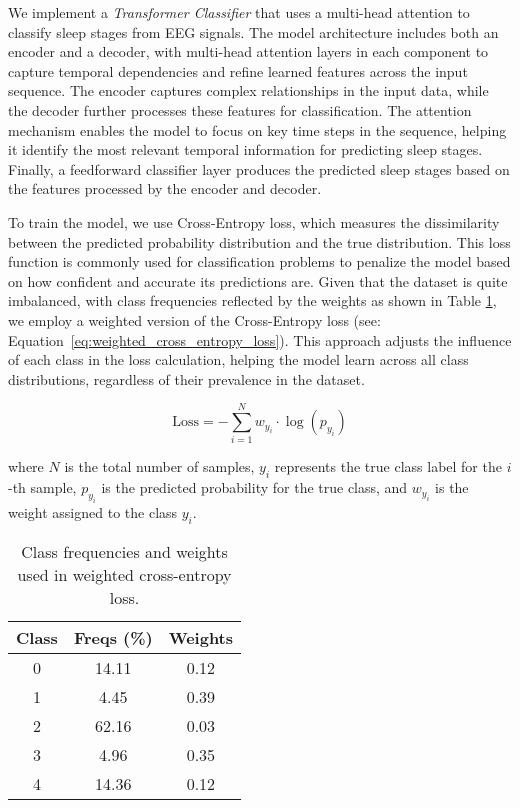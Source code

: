 We implement a \emph{Transformer Classifier} that uses a multi-head attention to classify sleep stages from EEG signals. The model architecture includes both an encoder and a decoder, with multi-head attention layers in each component to capture temporal dependencies and refine learned features across the input sequence. The encoder captures complex relationships in the input data, while the decoder further processes these features for classification. The attention mechanism enables the model to focus on key time steps in the sequence, helping it identify the most relevant temporal information for predicting sleep stages. Finally, a feedforward classifier layer produces the predicted sleep stages based on the features processed by the encoder and decoder.

To train the model, we use Cross-Entropy loss, which measures the dissimilarity between the predicted probability distribution and the true distribution. This loss function is commonly used for classification problems to penalize the model based on how confident and accurate its predictions are. Given that the dataset is quite imbalanced, with class frequencies reflected by the weights as shown in Table \ref{tab:class_freqs_weights}, we employ a weighted version of the Cross-Entropy loss (see: Equation~\ref{eq:weighted_cross_entropy_loss}). This approach adjusts the influence of each class in the loss calculation, helping the model learn across all class distributions, regardless of their prevalence in the dataset.

\begin{equation}
    \text{Loss} = -\sum_{i=1}^{N} w_{y_i} \cdot \log(p_{y_i})
    \label{eq:weighted_cross_entropy_loss}
\end{equation}

where \(N\) is the total number of samples, \(y_i\) represents the true class label for the \(i\)-th sample, \(p_{y_i}\) is the predicted probability for the true class, and \(w_{y_i}\) is the weight assigned to the class \(y_i\).

\begin{table}[h!]
    \centering
    \begin{tabular}{c|c|c}
    Class & Freqs (\%) & Weights \\
    \hline
    0 & 14.11 & 0.12 \\
    1 & 4.45  & 0.39 \\
    2 & 62.16 & 0.03 \\
    3 & 4.96  & 0.35 \\
    4 & 14.36 & 0.12 \\
    \end{tabular}
    \caption{Class frequencies and weights used in weighted cross-entropy loss.}
    \label{tab:class_freqs_weights}
\end{table}

